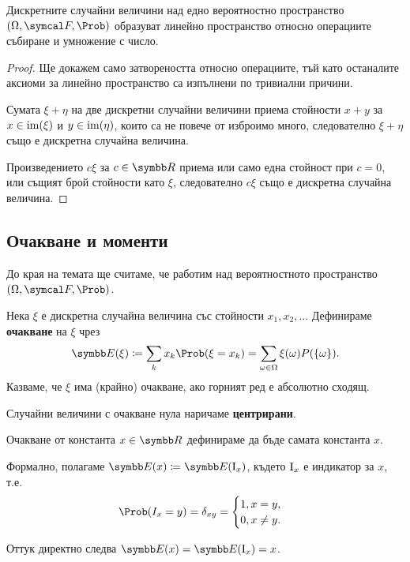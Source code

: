 \documentclass[numbers=endperiod, bibliography=totocnumbered]{scrartcl}
\begin{document}
\begin{proposition}
  Дискретните случайни величини над едно вероятностно пространство \( (\Omega, \F, \Prob) \) образуват линейно пространство относно операциите събиране и умножение с число.
\end{proposition}
\begin{proof}
  Ще докажем само затвореността относно операциите, тъй като останалите аксиоми за линейно пространство са изпълнени по тривиални причини.

  Сумата \( \xi + \eta \) на две дискретни случайни величини приема стойности \( x + y \) за \( x \in \operatorname{im}(\xi) \) и \( y \in \operatorname{im}(\eta) \), които са не повече от изброимо много, следователно \( \xi + \eta \) също е дискретна случайна величина.

  Произведението \( c \xi \) за \( c \in \R \) приема или само една стойност при \( c = 0 \), или същият брой стойности като \( \xi \), следователно \( c \xi \) също е дискретна случайна величина.
\end{proof}

\subsection{Очакване и моменти}

До края на темата ще считаме, че работим над вероятностното пространство \( (\Omega, \F, \Prob) \).

\begin{definition}
  Нека \( \xi \) е дискретна случайна величина със стойности \( x_1, x_2, \ldots \) Дефинираме \textbf{очакване} на \( \xi \) чрез
  \begin{equation*}
    \Expect(\xi) \coloneqq \sum_k x_k \Prob(\xi = x_k) = \sum_{\omega \in \Omega} \xi(\omega) P(\{ \omega \}).
  \end{equation*}
  Казваме, че \( \xi \) има (крайно) очакване, ако горният ред е абсолютно сходящ.

  Случайни величини с очакване нула наричаме \textbf{центрирани}.

  Очакване от константа \( x \in \R \) дефинираме да бъде самата константа \( x \).
\end{definition}

\begin{remark}
  Формално, полагаме \( \Expect(x) \coloneqq \Expect(\Ind_x) \), където \( \operatorname{I}_x \) е индикатор за \( x \), т.е.
  \begin{equation*}
    \Prob(I_x = y) = \delta_{xy} = \begin{cases}
      1, x = y, \\
      0, x \neq y.
    \end{cases}
  \end{equation*}

  Оттук директно следва \( \Expect(x) = \Expect(\Ind_x) = x \).
\end{remark}
\end{document}
